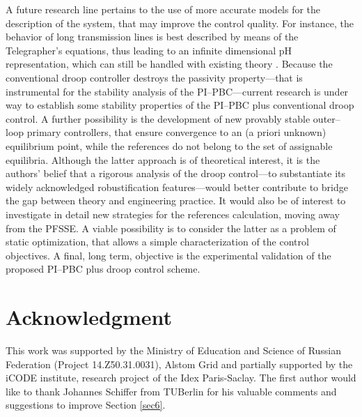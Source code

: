 \documentclass[5p,twocolumn]{elsarticle}
\numberwithin{equation}{section}
\begin{document}
A future research line pertains to the use of more accurate models for the description of the system, that may improve the control quality. For instance, the behavior of long transmission lines is best described by means of the Telegrapher's equations, thus leading to an infinite dimensional pH representation, which can still be handled with existing theory \cite{jeltsema}. Because the conventional droop controller destroys the passivity property---that is instrumental for the stability analysis of the PI--PBC---current research is  under way to establish some stability properties of the PI--PBC plus conventional droop control. A further possibility is the development of new provably stable outer--loop primary controllers, that ensure convergence to an (a priori unknown) equilibrium point, while the references do not belong to the set of assignable equilibria.  Although the latter approach is of theoretical interest, it is the authors' belief that a rigorous analysis of the droop control---to substantiate its widely acknowledged robustification features---would better contribute to bridge the gap between theory and engineering practice. It would also be of interest to investigate in detail new strategies for the references calculation, moving away from the PFSSE. A viable possibility is to consider the latter as a problem of static optimization, that allows a simple characterization of the control objectives. A final, long term, objective is the experimental validation of the proposed PI--PBC plus droop control scheme.









\section*{Acknowledgment}
This work was supported by the Ministry of Education and Science of Russian Federation (Project 14.Z50.31.0031), Alstom Grid and partially supported by the iCODE institute, research project of the Idex Paris-Saclay. The first author would like to thank Johannes Schiffer from TUBerlin for his valuable comments and suggestions to improve Section \ref{sec6}.










        
\end{document}
